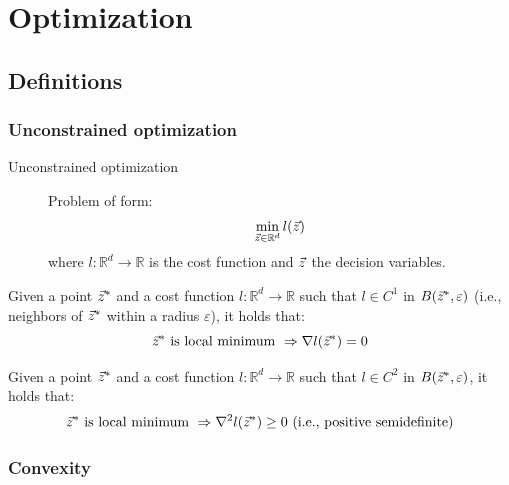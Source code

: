 \chapter{Optimization}


\section{Definitions}


\subsection{Unconstrained optimization}

\begin{description}
    \item[Unconstrained optimization] 
        Problem of form:
        \[ \min_{{\vec{z}} \in \mathbb{R}^d} l({\vec{z}}) \]
        where $l: \mathbb{R}^d \rightarrow \mathbb{R}$ is the cost function and ${\vec{z}}$ the decision variables.
\end{description}

\begin{theorem} 
    Given a point ${\vec{z}}^*$ and a cost function $l: \mathbb{R}^d \rightarrow \mathbb{R}$ such that $l \in C^1$ in $B({\vec{z}}^*, \varepsilon)$ (i.e., neighbors of ${\vec{z}}^*$ within a radius $\varepsilon$), it holds that:
    \[
        {\vec{z}}^* \text{ is local minimum } \Rightarrow \nabla l({\vec{z}}^*) = 0
    \]
\end{theorem}

\begin{theorem} 
    Given a point ${\vec{z}}^*$ and a cost function $l: \mathbb{R}^d \rightarrow \mathbb{R}$ such that $l \in C^2$ in $B({\vec{z}}^*, \varepsilon)$, it holds that:
    \[
        {\vec{z}}^* \text{ is local minimum } \Rightarrow \nabla^2 l({\vec{z}}^*) \geq 0 \text{ (i.e., positive semidefinite)}
    \]
\end{theorem}


\subsection{Convexity}

